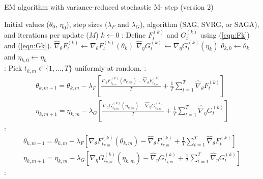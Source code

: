\begin{algorithm}
\caption{EM algorithm with variance-reduced stochastic M- step (version 2)}\label{alg:EM-SO-v2}
\begin{algorithmic}[1]
\Require Initial values ($\theta_{0}$, $\eta_{0}$), step sizes ($\lambda_F$ and $\lambda_G$), algorithm (SAG, SVRG, or SAGA), and iterations per update ($M$)
%
\State $k \gets 0$
%
:
    \State Define $F_t^{(k)}$ and $G_t^{(k)}$ using (\ref{eqn:Fk}) and (\ref{eqn:Gk}). 
    \State $\widehat \nabla_\theta F_t^{(k)} \gets \nabla_\theta F_t^{(k)} (\theta_k)$
    \State $\widehat \nabla_\eta G_t^{(k)} \gets \nabla_\eta G_t^{(k)} (\eta_k)$ 
\EndFor
%
\State $\theta_{k,0} \gets \theta_k$ and $\eta_{k,0} \gets \eta_k$
%
\\
%
%
:
    \State Pick $t_{k,m} \in \{1,\ldots,T\}$ uniformly at random.
    :
        \begin{gather}
            \theta_{k,m+1} = \theta_{k,m} - \lambda_F \left[\frac{\nabla_\theta F_{t_{k,m}}^{(k)}(\theta_{k,m}) - \widehat \nabla_\theta F_{t_{k,m}}^{(k)}}{T} + \frac{1}{T} \sum_{t=1}^T \widehat \nabla_\theta F^{(k)}_{t} \right] \\
            \eta_{k,m+1} = \eta_{k,m} - \lambda_G \left[\frac{\nabla_\eta G_{t_{k,m}}^{(k)}(\eta_{k,m}) - \widehat \nabla_\eta G_{t_{k,m}}^{(k)}}{T} + \frac{1}{T} \sum_{t=1}^T \widehat \nabla_\eta G^{(k)}_{t} \right]
        \end{gather}
    :
        \begin{gather}
            \theta_{k,m+1} = \theta_{k,m} - \lambda_F \left[\nabla_\theta F_{t_{k,m}}^{(k)}(\theta_{k,m}) - \widehat \nabla_\theta F_{t_{k,m}}^{(k)} + \frac{1}{T} \sum_{t=1}^T \widehat \nabla_\theta F^{(k)}_{t} \right] \\
            \eta_{k,m+1} = \eta_{k,m} - \lambda_G \left[\nabla_\eta G_{t_{k,m}}^{(k)}(\eta_{k,m}) - \widehat \nabla_\eta G_{t_{k,m}}^{(k)} + \frac{1}{T} \sum_{t=1}^T \widehat \nabla_\eta G^{(k)}_{t} \right]
        \end{gather}
    \EndIf
    :
        \begin{gather}

\end{gather}
\end{algorithmic}
\end{algorithm}
